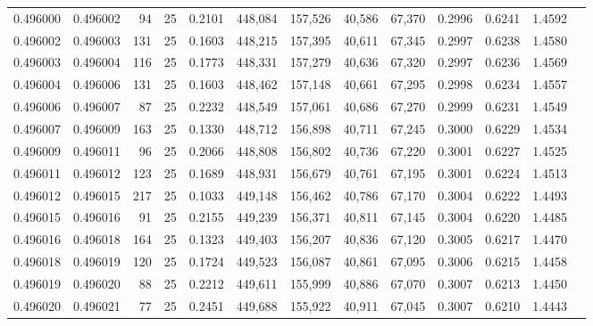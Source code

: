 \begin{tabular}{rrrrrrrrrrrrr}
0.496000 & 0.496002 &    94 &  25 &                                     0.2101 & 448,084 & 157,526 &  40,586 &  67,370 & 0.2996 & 0.6241 & 1.4592 \\
0.496002 & 0.496003 &   131 &  25 &                                     0.1603 & 448,215 & 157,395 &  40,611 &  67,345 & 0.2997 & 0.6238 & 1.4580 \\
0.496003 & 0.496004 &   116 &  25 &                                     0.1773 & 448,331 & 157,279 &  40,636 &  67,320 & 0.2997 & 0.6236 & 1.4569 \\
0.496004 & 0.496006 &   131 &  25 &                                     0.1603 & 448,462 & 157,148 &  40,661 &  67,295 & 0.2998 & 0.6234 & 1.4557 \\
0.496006 & 0.496007 &    87 &  25 &                                     0.2232 & 448,549 & 157,061 &  40,686 &  67,270 & 0.2999 & 0.6231 & 1.4549 \\
0.496007 & 0.496009 &   163 &  25 &                                     0.1330 & 448,712 & 156,898 &  40,711 &  67,245 & 0.3000 & 0.6229 & 1.4534 \\
0.496009 & 0.496011 &    96 &  25 &                                     0.2066 & 448,808 & 156,802 &  40,736 &  67,220 & 0.3001 & 0.6227 & 1.4525 \\
0.496011 & 0.496012 &   123 &  25 &                                     0.1689 & 448,931 & 156,679 &  40,761 &  67,195 & 0.3001 & 0.6224 & 1.4513 \\
0.496012 & 0.496015 &   217 &  25 &                                     0.1033 & 449,148 & 156,462 &  40,786 &  67,170 & 0.3004 & 0.6222 & 1.4493 \\
0.496015 & 0.496016 &    91 &  25 &                                     0.2155 & 449,239 & 156,371 &  40,811 &  67,145 & 0.3004 & 0.6220 & 1.4485 \\
0.496016 & 0.496018 &   164 &  25 &                                     0.1323 & 449,403 & 156,207 &  40,836 &  67,120 & 0.3005 & 0.6217 & 1.4470 \\
0.496018 & 0.496019 &   120 &  25 &                                     0.1724 & 449,523 & 156,087 &  40,861 &  67,095 & 0.3006 & 0.6215 & 1.4458 \\
0.496019 & 0.496020 &    88 &  25 &                                     0.2212 & 449,611 & 155,999 &  40,886 &  67,070 & 0.3007 & 0.6213 & 1.4450 \\
0.496020 & 0.496021 &    77 &  25 &                                     0.2451 & 449,688 & 155,922 &  40,911 &  67,045 & 0.3007 & 0.6210 & 1.4443 \\

\end{tabular}
